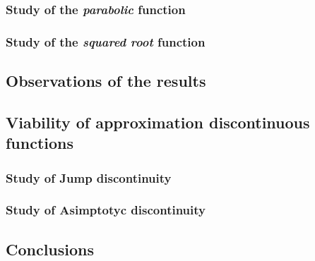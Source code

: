\documentclass[a4paper, 11pt]{article}
\begin{document}
\subsubsection{Study of the \textit{parabolic} function}
\subsubsection{Study of the \textit{squared root} function}

\newpage
\subsection{Observations of the results}
\subsection{Viability of approximation discontinuous functions}
\subsubsection{Study of Jump discontinuity}
\subsubsection{Study of Asimptotyc discontinuity}
\subsection{Conclusions}
\end{document}
